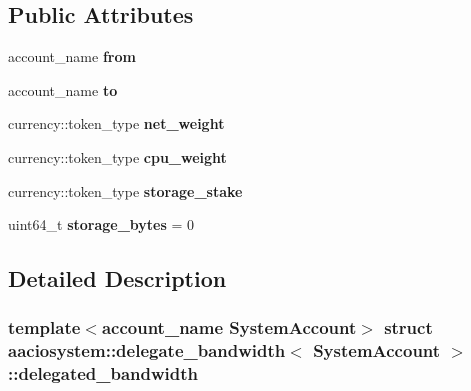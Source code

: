 \subsection*{Public Attributes}
\begin{DoxyCompactItemize}
\item 
\mbox{\label{structaaciosystem_1_1delegate__bandwidth_1_1delegated__bandwidth_a2be841cb36728ff388008a1680fad1cf}} 
account\+\_\+name {\bfseries from}
\item 
\mbox{\label{structaaciosystem_1_1delegate__bandwidth_1_1delegated__bandwidth_a321ab1ef4fe15f1ccf3fbacd5d5c7444}} 
account\+\_\+name {\bfseries to}
\item 
\mbox{\label{structaaciosystem_1_1delegate__bandwidth_1_1delegated__bandwidth_a21694e9fbfca6d5fb0dace00d54eb877}} 
currency\+::token\+\_\+type {\bfseries net\+\_\+weight}
\item 
\mbox{\label{structaaciosystem_1_1delegate__bandwidth_1_1delegated__bandwidth_a12da86bef61edfddac037ed324088b25}} 
currency\+::token\+\_\+type {\bfseries cpu\+\_\+weight}
\item 
\mbox{\label{structaaciosystem_1_1delegate__bandwidth_1_1delegated__bandwidth_abd1c2d8b89181ca4aa47b8b140adcca6}} 
currency\+::token\+\_\+type {\bfseries storage\+\_\+stake}
\item 
\mbox{\label{structaaciosystem_1_1delegate__bandwidth_1_1delegated__bandwidth_a29dd0bdd6df4054096634a416b07a7e2}} 
uint64\+\_\+t {\bfseries storage\+\_\+bytes} = 0
\end{DoxyCompactItemize}


\subsection{Detailed Description}
\subsubsection*{template$<$account\+\_\+name System\+Account$>$\newline
struct aaciosystem\+::delegate\+\_\+bandwidth$<$ System\+Account $>$\+::delegated\+\_\+bandwidth}

